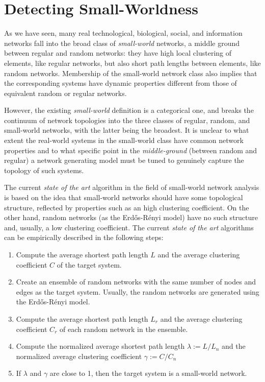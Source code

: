 \section{Detecting Small-Worldness}

As we have seen, many real technological, biological, social, and information networks fall into the broad class of \emph{small-world} networks, a middle ground between regular and random networks: they have high local clustering of elements, like regular networks, but also short path lengths between elements, like random networks. Membership of the small-world network class also implies that the corresponding systems have dynamic properties different from those of equivalent random or regular networks. \s

\nd However, the existing \emph{small-world} definition is a categorical one, and breaks the continuum of network topologies into the three classes of regular, random, and small-world networks, with the latter being the broadest. It is unclear to what extent the real-world systems in the small-world class have common network properties and to what specific point in the \emph{middle-ground} (between random and regular) a network generating model must be tuned to genuinely capture the topology of such systems. \s

\nd The current \emph{state of the art} algorithm in the field of small-world network analysis is based on the idea that small-world networks should have some topological structure, reflected by properties such as an high clustering coefficient. On the other hand, random networks (as the Erd\H{o}s-R\'enyi model) have no such structure and, usually, a low clustering coefficient. The current \emph{state of the art} algorithms can be empirically described in the following steps:

\begin{enumerate}
    \item Compute the average shortest path length $L$ and the average clustering coefficient $C$ of the target system.
    \item Create an ensemble of random networks with the same number of nodes and edges as the target system. Usually, the random networks are generated using the Erd\H{o}s-R\'enyi model.
    \item Compute the average shortest path length $L_r$ and the average clustering coefficient $C_r$ of each random network in the ensemble.
    \item Compute the normalized average shortest path length $\lambda := L/L_n$ and the normalized average clustering coefficient $\gamma := C/C_n$
    \item If $\lambda$ and $\gamma$ are close to 1, then the target system is a small-world network.
\end{enumerate}

